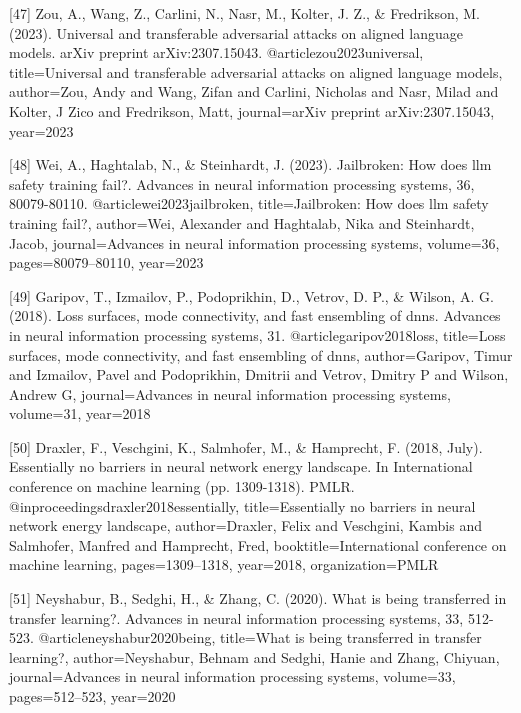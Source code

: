 \documentclass{article}
\begin{document}
{[47] Zou, A., Wang, Z., Carlini, N., Nasr, M., Kolter, J. Z., & Fredrikson, M. (2023). Universal and transferable adversarial attacks on aligned language models. arXiv preprint arXiv:2307.15043.
@article{zou2023universal,
  title={Universal and transferable adversarial attacks on aligned language models},
  author={Zou, Andy and Wang, Zifan and Carlini, Nicholas and Nasr, Milad and Kolter, J Zico and Fredrikson, Matt},
  journal={arXiv preprint arXiv:2307.15043},
  year={2023}
}

[48] Wei, A., Haghtalab, N., & Steinhardt, J. (2023). Jailbroken: How does llm safety training fail?. Advances in neural information processing systems, 36, 80079-80110.
@article{wei2023jailbroken,
  title={Jailbroken: How does llm safety training fail?},
  author={Wei, Alexander and Haghtalab, Nika and Steinhardt, Jacob},
  journal={Advances in neural information processing systems},
  volume={36},
  pages={80079--80110},
  year={2023}
}

[49] Garipov, T., Izmailov, P., Podoprikhin, D., Vetrov, D. P., & Wilson, A. G. (2018). Loss surfaces, mode connectivity, and fast ensembling of dnns. Advances in neural information processing systems, 31.
@article{garipov2018loss,
  title={Loss surfaces, mode connectivity, and fast ensembling of dnns},
  author={Garipov, Timur and Izmailov, Pavel and Podoprikhin, Dmitrii and Vetrov, Dmitry P and Wilson, Andrew G},
  journal={Advances in neural information processing systems},
  volume={31},
  year={2018}
}

[50] Draxler, F., Veschgini, K., Salmhofer, M., & Hamprecht, F. (2018, July). Essentially no barriers in neural network energy landscape. In International conference on machine learning (pp. 1309-1318). PMLR.
@inproceedings{draxler2018essentially,
  title={Essentially no barriers in neural network energy landscape},
  author={Draxler, Felix and Veschgini, Kambis and Salmhofer, Manfred and Hamprecht, Fred},
  booktitle={International conference on machine learning},
  pages={1309--1318},
  year={2018},
  organization={PMLR}
}

[51] Neyshabur, B., Sedghi, H., & Zhang, C. (2020). What is being transferred in transfer learning?. Advances in neural information processing systems, 33, 512-523.
@article{neyshabur2020being,
  title={What is being transferred in transfer learning?},
  author={Neyshabur, Behnam and Sedghi, Hanie and Zhang, Chiyuan},
  journal={Advances in neural information processing systems},
  volume={33},
  pages={512--523},
  year={2020}
}

}
\end{document}
